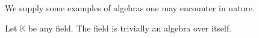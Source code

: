 \documentclass[../thesis.tex]{subfiles}
\begin{document}










            We supply some examples of algebras one may encounter in nature.

            \begin{example}
                Let $\mathbb{K}$ be any field. The field is trivially an algebra over itself.
            \end{example}
\end{document}
